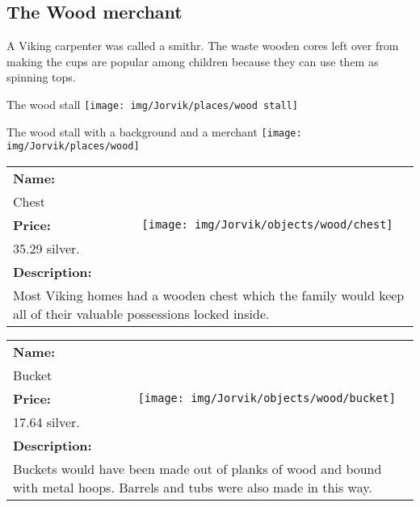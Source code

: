 

\clearpage
\subsection{The Wood merchant}
\label{sec:appendix:moj:wood}

A Viking carpenter was called a smithr. The waste wooden cores left over from making the cups are popular among children because they can use them as spinning tops.

\begin{display}{The wood stall}
	\label{fig:appendix:moj:places:wood:stall}
	\texttt{[image: img/Jorvik/places/wood stall]}
\end{display}

\begin{display}{The wood stall with a background and a merchant}
	\label{fig:appendix:moj:places:wood}
	\texttt{[image: img/Jorvik/places/wood]}
\end{display}
\clearpage


\begin{table}[ht!]
	\centering
	\begin{tabular}{ p{3cm} c }\toprule
		\textbf{Name:} & \multirow{5}{*}{\texttt{[image: img/Jorvik/objects/wood/chest]}}\\
		Chest & \\ 
		\textbf{Price:} & \\
		35.29 silver. & \\ 
		\textbf{Description:} & \\
		\multicolumn{2}{p{12cm}}{Most Viking homes had a wooden chest which the family would keep all of their valuable possessions locked inside.}\\
		\bottomrule
	\end{tabular}
\end{table}

\begin{table}[ht!]
	\centering
	\begin{tabular}{ p{3cm} c }\toprule
		\textbf{Name:} & \multirow{5}{*}{\texttt{[image: img/Jorvik/objects/wood/bucket]}}\\
		Bucket & \\ 
		\textbf{Price:} & \\
		17.64 silver. & \\ 
		\textbf{Description:} & \\
		\multicolumn{2}{p{12cm}}{Buckets would have been made out of planks of wood and bound with metal hoops. Barrels and tubs were also made in this way.}\\
		\bottomrule
	\end{tabular}
\end{table}

